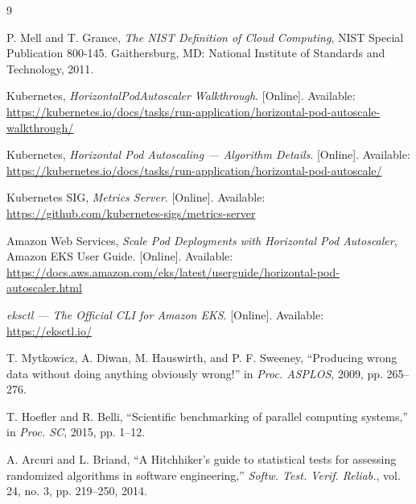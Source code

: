 \documentclass[conference]{IEEEtran}
\begin{document}
\begin{thebibliography}{9}

P. Mell and T. Grance, \emph{The NIST Definition of Cloud Computing}, NIST
Special Publication 800-145. Gaithersburg, MD: National Institute of Standards
and Technology, 2011.

Kubernetes, \emph{HorizontalPodAutoscaler Walkthrough}. [Online]. Available:
\url{https://kubernetes.io/docs/tasks/run-application/horizontal-pod-autoscale-walkthrough/}

Kubernetes, \emph{Horizontal Pod Autoscaling --- Algorithm Details}. [Online].
Available:
\url{https://kubernetes.io/docs/tasks/run-application/horizontal-pod-autoscale/}

Kubernetes SIG, \emph{Metrics Server}. [Online]. Available:
\url{https://github.com/kubernetes-sigs/metrics-server}

Amazon Web Services, \emph{Scale Pod Deployments with Horizontal Pod
Autoscaler}, Amazon EKS User Guide. [Online]. Available:
\url{https://docs.aws.amazon.com/eks/latest/userguide/horizontal-pod-autoscaler.html}

\emph{eksctl --- The Official CLI for Amazon EKS}. [Online]. Available:
\url{https://eksctl.io/}

T. Mytkowicz, A. Diwan, M. Hauswirth, and P. F. Sweeney, ``Producing wrong data
without doing anything obviously wrong!'' in \emph{Proc. ASPLOS}, 2009,
pp. 265--276.

T. Hoefler and R. Belli, ``Scientific benchmarking of parallel computing
systems,'' in \emph{Proc. SC}, 2015, pp. 1--12.

A. Arcuri and L. Briand, ``A Hitchhiker's guide to statistical tests for
assessing randomized algorithms in software engineering,'' \emph{Softw. Test.
Verif. Reliab.}, vol. 24, no. 3, pp. 219--250, 2014.

\end{thebibliography}
\end{document}
